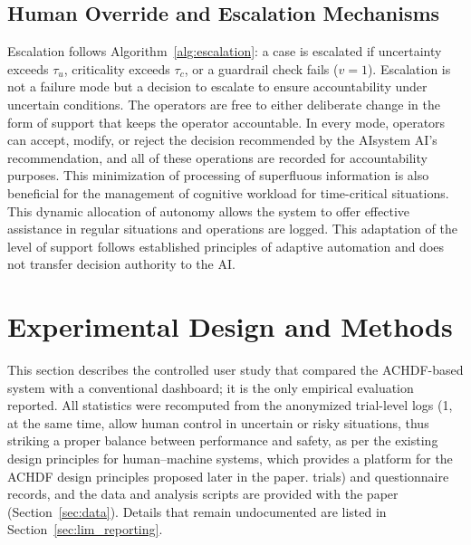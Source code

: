 \documentclass[journal]{IEEEtran}
\theoremstyle{plain}
\theoremstyle{definition}
\providecommand{\DIFaddtex}[1]{{\protect\color{blue} \sf #1}} %
\providecommand{\DIFdeltex}[1]{{\protect\color{red} \scriptsize #1}} %
\providecommand{\DIFaddbegin}{} %
\providecommand{\DIFaddend}{} %
\providecommand{\DIFdelbegin}{} %
\providecommand{\DIFdelend}{} %
\providecommand{\DIFadd}[1]{\texorpdfstring{\DIFaddtex{#1}}{#1}} %
\providecommand{\DIFdel}[1]{\texorpdfstring{\DIFdeltex{#1}}{}} %
\newcommand{\DIFscaledelfig}{0.5}
\newlength{\DIFdelgraphicswidth} %
\newlength{\DIFdelgraphicsheight} %
\newcommand{\DIFaddincludegraphics}[2][]{{\color{blue}\fbox{\DIFOincludegraphics[#1]{#2}}}} %
\newcommand{\DIFdelincludegraphics}[2][]{%
\sbox{\DIFdelgraphicsbox}{\DIFOincludegraphics[#1]{#2}}%
\settoboxwidth{\DIFdelgraphicswidth}{\DIFdelgraphicsbox} %
\settoboxtotalheight{\DIFdelgraphicsheight}{\DIFdelgraphicsbox} %
\scalebox{\DIFscaledelfig}{%
\parbox[b]{\DIFdelgraphicswidth}{\usebox{\DIFdelgraphicsbox}\\[-\baselineskip] \rule{\DIFdelgraphicswidth}{0em}}\llap{\resizebox{\DIFdelgraphicswidth}{\DIFdelgraphicsheight}{%
\setlength{\unitlength}{\DIFdelgraphicswidth}%
\begin{picture}(1,1)%
\thicklines\linethickness{2pt} %
{\color[rgb]{1,0,0}\put(0,0){\framebox(1,1){}}}%
{\color[rgb]{1,0,0}\put(0,0){\line( 1,1){1}}}%
{\color[rgb]{1,0,0}\put(0,1){\line(1,-1){1}}}%
\end{picture}%
}\hspace*{3pt}}} %
} %
\DeclareRobustCommand{\DIFaddbegin}{\DIFOaddbegin \let\includegraphics\DIFaddincludegraphics} %
\DeclareRobustCommand{\DIFaddend}{\DIFOaddend \let\includegraphics\DIFOincludegraphics} %
\DeclareRobustCommand{\DIFdelbegin}{\DIFOdelbegin \let\includegraphics\DIFdelincludegraphics} %
\DeclareRobustCommand{\DIFdelend}{\DIFOaddend \let\includegraphics\DIFOincludegraphics} %
\begin{document}
\subsection{\DIFadd{Human Override and Escalation Mechanisms}}
\DIFadd{Escalation follows Algorithm~\ref{alg:escalation}: a case is escalated if uncertainty exceeds $\tau_u$, criticality exceeds $\tau_c$, or a guardrail check fails ($v=1$). Escalation }\DIFaddend is not a failure mode but a \DIFdelbegin \DIFdel{decision to escalate to ensure accountability under uncertain conditions. The operators are free to either }\DIFdelend \DIFaddbegin \DIFadd{deliberate change in the form of support that keeps the operator accountable. In every mode, operators can }\DIFaddend accept, modify, or reject the \DIFdelbegin \DIFdel{decision recommended by the AIsystem}\DIFdelend \DIFaddbegin \DIFadd{AI's recommendation}\DIFaddend , and all \DIFdelbegin \DIFdel{of these operations are recorded for accountability purposes. This minimization of processing of superfluous information is also beneficial for the management of cognitive workload for time-critical situations.
This dynamic allocation of autonomy allows the system to offer effective assistance in regular situations and }\DIFdelend \DIFaddbegin \DIFadd{operations are logged. This adaptation of the level of support follows established principles of adaptive automation \cite{Parasuraman2000LOA,Scerbo2007} and does not transfer decision authority to the AI.
}


    \section{\DIFadd{Experimental Design and Methods}}

    \DIFadd{This section describes the controlled user study that compared the ACHDF-based system with a conventional dashboard; it is the only empirical evaluation reported. All statistics were recomputed from the anonymized trial-level logs (1}\DIFaddend ,\DIFdelbegin \DIFdel{at the same time, allow human control in uncertain or risky situations, thus striking a proper balance between performance and safety, as per the existing design principles for human--machine systems, which provides a platform for the ACHDF design principles proposed later in the paper.
}\DIFdelend \DIFaddbegin \DIFadd{040 trials) and questionnaire records, and the data and analysis scripts are provided with the paper (Section~\ref{sec:data}). Details that remain undocumented are listed in Section~\ref{sec:lim_reporting}.
}\DIFaddend 
\end{document}
